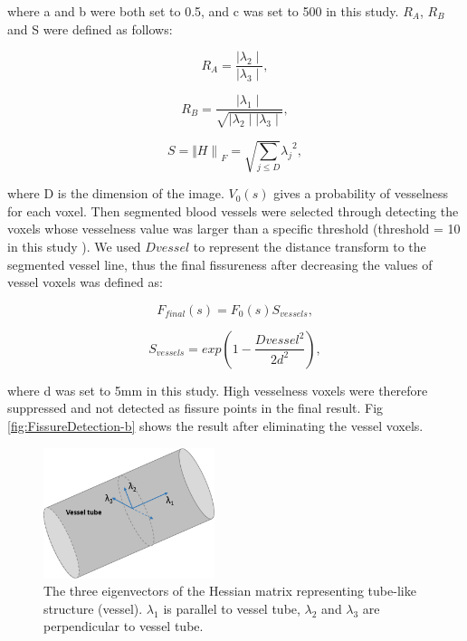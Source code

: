 {\noindent where a and b were both set to 0.5, and c was set to 500 in this study. $R_A$, $R_B$ and S were defined as follows:

\begin{equation}
\label{eq:VesselHessian2}
R_A = \frac{\mid\lambda_{2}\mid}{\mid\lambda_{3}\mid}, 
\end{equation}

\begin{equation}
\label{eq:VesselHessian3}
R_B = \frac{\mid\lambda_{1}\mid}{\sqrt{\mid\lambda_{2}\mid \mid\lambda_{3}\mid}},
\end{equation}

\begin{equation}
\label{eq:VesselHessian3}
S = {\Vert H \rVert}_F = \sqrt{\sum_{j\leq D}}{\lambda_j}^2,
\end{equation}

\noindent where D is the dimension of the image. $V_0(s)$ gives a probability of vesselness for each voxel. Then segmented blood vessels were selected through detecting the voxels whose vesselness value was larger than a specific threshold (threshold = 10 in this study \citep{frangi1998multiscale}). We used $D{vessel}$ to represent the distance transform to the segmented vessel line, thus the final fissureness after decreasing the values of vessel voxels was defined as:

\begin{equation}
\label{eq:FinalFissureness}
F_{final}(s) = F_0(s)S_{vessels},
\end{equation}

\begin{equation}
\label{eq:FinalFissureness}
S_{vessels} = exp(1-\frac{{D{vessel}}^2}{2d^2}),
\end{equation}

\noindent  where d was set to 5mm in this study. High vesselness voxels were therefore suppressed and not detected as fissure points in the final result. Fig \ref{fig:FissureDetection-b} shows the result after eliminating the vessel voxels.

\begin{figure}[htbp]
  \centering 
  \includegraphics[height=1.5in]{Segmentation/Image/VesselHessianEigenvector.png}
  \caption{The three eigenvectors of the Hessian matrix representing tube-like structure (vessel). $\lambda_1$ is parallel to vessel tube, $\lambda_2$  and $\lambda_3$ are perpendicular to vessel tube.}
  \label{fig:VesselHessianEigenvector}
\end{figure}

}
